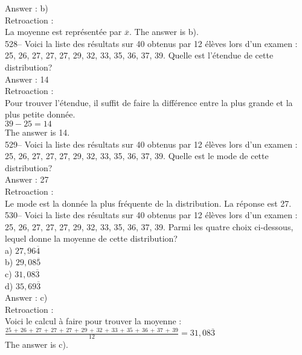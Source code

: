 ﻿\documentclass[letterpaper, 12pt]{article}
\begin{document}
Answer : b)\\

Retroaction : \\
La moyenne est repr\'esent\'ee par $\overline{x}$.  The answer is b).\\

528-- Voici la liste des r\'esultats sur 40 obtenus par 12 \'el\`eves lors
d'un examen : 25, 26, 27, 27, 27, 29, 32, 33, 35, 36, 37, 39.  Quelle est
l'\'etendue de cette distribution?\\

Answer : 14\\

Retroaction : \\
Pour trouver l'\'etendue, il suffit de faire la diff\'erence entre la plus
grande et la plus petite donn\'ee.  \\
$39-25=14$\\
The answer is 14.\\

529-- Voici la liste des r\'esultats sur 40 obtenus par 12 \'el\`eves lors
d'un examen : 25, 26, 27, 27, 27, 29, 32, 33, 35, 36, 37, 39.  Quelle est le
mode de cette distribution?\\

Answer : 27\\

Retroaction : \\
Le mode est la donn\'ee la plus fr\'equente de la distribution.  La
r\'eponse est 27.\\

530-- Voici la liste des r\'esultats sur 40 obtenus par 12 \'el\`eves lors
d'un examen : 25, 26, 27, 27, 27, 29, 32, 33, 35, 36, 37, 39.  Parmi les
quatre choix ci-dessous, lequel donne la moyenne de cette distribution?\\
a) $27,96\overline{4}$\\
b) $29,08\overline{5}$\\
c) $31,08\overline{3}$\\
d) $35,69\overline{3}$\\

Answer : c) \\

Retroaction : \\
Voici le calcul \`a faire pour trouver la moyenne :\\[2mm]
$\frac{25\,+\,26\,+\,27\,+\,27\,+\,27\,+\,29\,+\,32\,+\,33\,+\,35\,+\,36\,+\,37\,+\,39}{12}=31,08\overline{3}$\\[2mm]
The answer is c).\\
\end{document}
